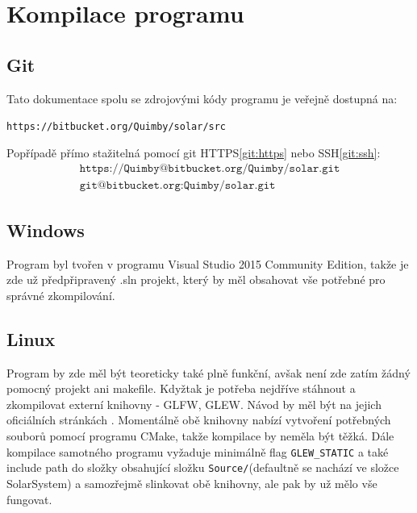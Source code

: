 \chapter{Kompilace programu}
\section{Git}
Tato dokumentace spolu se zdrojovými kódy programu je veřejně dostupná na:
\begin{center}
\texttt{https://bitbucket.org/Quimby/solar/src}
\end{center}
Popřípadě přímo stažitelná pomocí git HTTPS\eqref{git:https} nebo SSH\eqref{git:ssh}:
\begin{align}
	\label{git:https}
	\texttt{https://Quimby@bitbucket.org/Quimby/solar.git}\\
	\label{git:ssh}
	\texttt{git@bitbucket.org:Quimby/solar.git}
\end{align}
\section{Windows}
Program byl tvořen v programu Visual Studio 2015 Community Edition, takže je zde už předpřipravený .sln projekt, který by měl obsahovat vše potřebné pro správné zkompilování.
\section{Linux}
Program by zde měl být teoreticky také plně funkční, avšak není zde zatím žádný pomocný projekt ani makefile. Kdyžtak je potřeba nejdříve stáhnout a zkompilovat externí knihovny - GLFW, GLEW. Návod by měl být na jejich oficiálních stránkách . Momentálně obě knihovny nabízí vytvoření potřebných souborů pomocí programu CMake, takže kompilace by neměla být těžká. Dále kompilace samotného programu vyžaduje minimálně flag \texttt{GLEW\_STATIC} a také include path do složky obsahující složku \texttt{Source/}(defaultně se nachází ve složce SolarSystem) a samozřejmě slinkovat obě knihovny, ale pak by už mělo vše fungovat. 